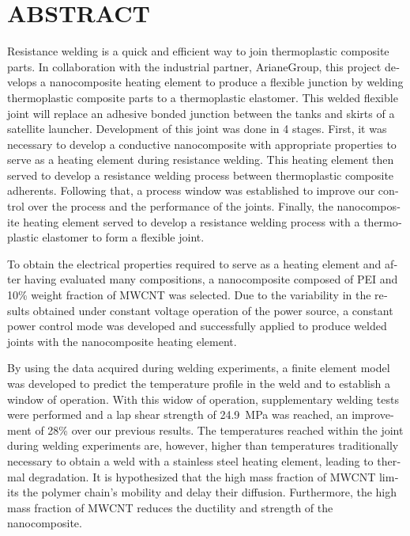 %

\chapter*{ABSTRACT}\thispagestyle{headings}
%
\begin{otherlanguage}{english}
	
	Resistance welding is a quick and efficient way to join thermoplastic composite parts. 
	In collaboration with the industrial partner, ArianeGroup, this project develops a nanocomposite heating element to produce a flexible junction by welding thermoplastic composite parts to a thermoplastic elastomer. 
	This welded flexible joint will replace an adhesive bonded junction between the tanks and skirts of a satellite launcher. 
	Development of this joint was done in 4 stages. 
	First, it was necessary to develop a conductive nanocomposite with appropriate properties to serve as a heating element during resistance welding. 
	This heating element then served to develop a resistance welding process between thermoplastic composite adherents. 
	Following that, a process window was established to improve our control over the process and the performance of the joints. 
	Finally, the nanocomposite heating element served to develop a resistance welding process with a thermoplastic elastomer to form a flexible joint. 
	
	To obtain the electrical properties required to serve as a heating element and after having evaluated many compositions, a nanocomposite composed of PEI and 10\% weight fraction of MWCNT was selected. 
	Due to the variability in the results obtained under constant voltage operation of the power source, a constant power control mode was developed and successfully applied to produce welded joints with the nanocomposite heating element. 
	
	By using the data acquired during welding experiments, a finite element model was developed to predict the temperature profile in the weld and to establish a window of operation. 
	With this widow of operation, supplementary welding tests were performed and a lap shear strength of \SI{24.9}{\mega\pascal} was reached, an improvement of 28\% over our previous results. 
	The temperatures reached within the joint during welding experiments are, however, higher than temperatures traditionally necessary to obtain a weld with a stainless steel heating element, leading to thermal degradation. 
	It is hypothesized that the high mass fraction of MWCNT limits the polymer chain's mobility and delay their diffusion. 
	Furthermore, the high mass fraction of MWCNT reduces the ductility and strength of the nanocomposite. 
	

\end{otherlanguage}
